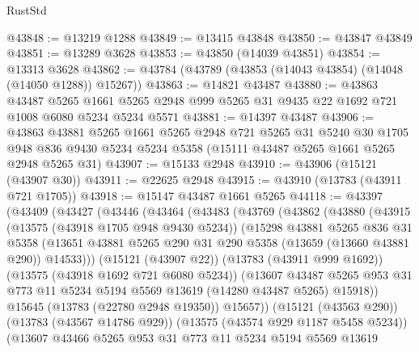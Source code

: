 \begin{lexlean}{RustStd}
\begin{coremodule}
@43848 := @13219 @1288
@43849 := @13415 @43848
@43850 := @43847 @43849
@43851 := @13289 @3628
@43853 := @43850 (@14039 @43851)
@43854 := @13313 @3628
@43862 := @43784 (@43789 (@43853 (@14043 @43854) (@14048 (@14050 @1288)) @15267))
@43863 := @14821 @43487
@43880 := @43863
    @43487
    @5265
    @1661
    @5265
    @2948
    @999
    @5265
    @31
    @9435
    @22
    @1692
    @721
    @1008
    @6080
    @5234
    @5234
    @5571
@43881 := @14397 @43487
@43906 := @43863
    @43881
    @5265
    @1661
    @5265
    @2948
    @721
    @5265
    @31
    @5240
    @30
    @1705
    @948
    @836
    @9430
    @5234
    @5234
    @5358
    (@15111 @43487 @5265 @1661 @5265 @2948 @5265 @31)
@43907 := @15133 @2948
@43910 := @43906 (@15121 (@43907 @30))
@43911 := @22625 @2948
@43915 := @43910 (@13783 (@43911 @721 @1705))
@43918 := @15147 @43487 @1661 @5265
@44118 := @43397
    (@43409
      (@43427
        (@43446
          (@43464
            (@43483
              (@43769
                (@43862
                  (@43880
                    (@43915
                      (@13575 (@43918 @1705 @948 @9430 @5234))
                      (@15298
                        @43881
                        @5265
                        @836
                        @31
                        @5358
                        (@13651
                          @43881
                          @5265
                          @290
                          @31
                          @290
                          @5358
                          (@13659 (@13660 @43881 @290))
                          @14533)))
                    (@15121 (@43907 @22))
                    (@13783 (@43911 @999 @1692))
                    (@13575 (@43918 @1692 @721 @6080 @5234))
                    (@13607
                      @43487
                      @5265
                      @953
                      @31
                      @773
                      @11
                      @5234
                      @5194
                      @5569
                      @13619
                      (@14280 @43487 @5265)
                      @15918))
                  @15645
                  (@13783 (@22780 @2948 @19350))
                  @15657))
              (@15121 (@43563 @290))
              (@13783 (@43567 @14786 @929))
              (@13575 (@43574 @929 @1187 @5458 @5234))
              (@13607
                @43466
                @5265
                @953
                @31
                @773
                @11
                @5234
                @5194
                @5569
                @13619

\end{coremodule}
\end{lexlean}
